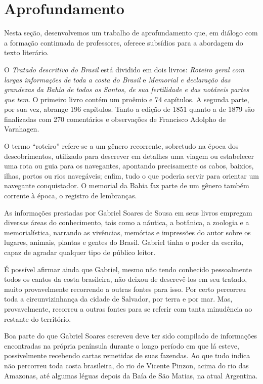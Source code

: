 \documentclass[12pt]{extarticle}
\begin{document}
\section{Aprofundamento}


Nesta seção, desenvolvemos um trabalho de aprofundamento que, em diálogo
com a formação continuada de professores, oferece subsídios para a
abordagem do texto literário.

O \textit{Tratado descritivo do Brasil} está dividido em dois livros: 
\textit{Roteiro geral com largas informações de toda a costa do Brasil} e \textit{Memorial e declaração das grandezas da Bahia de todos os Santos, de sua fertilidade e das notáveis partes que tem}. O primeiro livro contém um proêmio e 74 capítulos. A segunda parte, por sua vez, abrange 196 capítulos. Tanto a edição de 1851 quanto a de 1879 são finalizadas com 270 comentários e observações de Francisco Adolpho de Varnhagen.

O termo ``roteiro'' refere-se a um gênero recorrente, sobretudo na época dos descobrimentos, utilizado para descrever em detalhes uma viagem ou estabelecer uma rota ou guia para os navegantes, apontando precisamente os cabos, baixios, ilhas, portos ou rios navegáveis; enfim, tudo o que poderia servir para orientar um navegante conquistador. O memorial da Bahia faz parte de um gênero também corrente à época, o registro de lembranças.

As informações prestadas por Gabriel Soares de Sousa em seus livros empregam diversas áreas do conhecimento, tais como a náutica, a botânica, a zoologia e a memorialística, narrando as vivências, memórias e impressões do autor sobre os lugares, animais, plantas e gentes do Brasil. Gabriel tinha o poder da escrita, capaz de agradar qualquer tipo de público leitor.

É possível afirmar ainda que Gabriel, mesmo não tendo conhecido pessoalmente todos os cantos da costa brasileira, não deixou de descrevê-los em seu tratado, muito provavelmente recorrendo a outras fontes para isso. Por certo percorreu toda a circunvizinhança da cidade de Salvador, por terra e por mar. Mas, provavelmente, recorreu a outras fontes para se referir com tanta minudência ao restante do território.

Boa parte do que Gabriel Soares escreveu deve ter sido compilado de informações encontradas na própria península durante o longo período em que lá esteve, possivelmente recebendo cartas remetidas de suas fazendas. Ao que tudo indica não percorreu toda costa brasileira, do rio de Vicente Pinzon, acima do rio das Amazonas, até algumas léguas depois da Baía de São Matias, na atual Argentina. 
\end{document}
